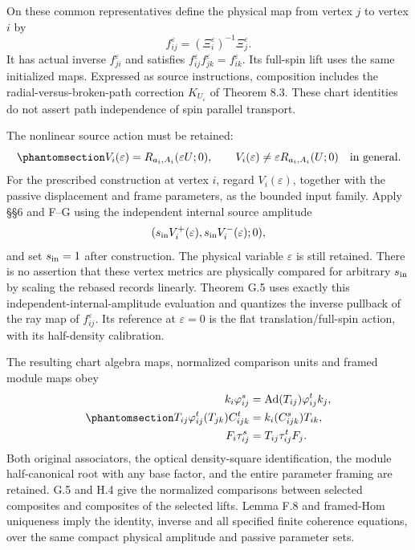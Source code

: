 \documentclass[
  english,
  11pt,
  reqno]{amsart}
\begin{document}
On these common representatives define the physical map from vertex
\(j\) to vertex \(i\) by \[
 f_{ij}^\varepsilon=(\Xi_i^\varepsilon)^{-1}\Xi_j^\varepsilon.
\] It has actual inverse \(f_{ji}^\varepsilon\) and satisfies
\(f_{ij}^\varepsilon f_{jk}^\varepsilon=f_{ik}^\varepsilon\). Its
full-spin lift uses the same initialized maps. Expressed as source
instructions, composition includes the radial-versus-broken-path
correction \(K_{U_\varepsilon}\) of Theorem 8.3. These chart identities
do not assert path independence of spin parallel transport.

The nonlinear source action must be retained:
\begin{equation}\protect\phantomsection\label{eq:schw-bc-amplitude-rebase-distinction}{
 V_i(\varepsilon)=R_{a_i,A_i}(\varepsilon U;0),\qquad
 V_i(\varepsilon)\ne\varepsilon R_{a_i,A_i}(U;0)
 \quad\hbox{in general}.
}\end{equation} For the prescribed construction at vertex \(i\), regard
\(V_i(\varepsilon)\), together with the passive displacement and frame
parameters, as the bounded input family. Apply §§6 and F--G using the
independent internal source amplitude \[
 (s_{\rm in}V_i^+(\varepsilon),s_{\rm in}V_i^-(\varepsilon);0),
\] and set \(s_{\rm in}=1\) after construction. The physical variable
\(\varepsilon\) is still retained. There is no assertion that these
vertex metrics are physically compared for arbitrary \(s_{\rm in}\) by
scaling the rebased records linearly. Theorem G.5 uses exactly this
independent-internal-amplitude evaluation and quantizes the inverse
pullback of the ray map of \(f_{ij}^\varepsilon\). Its reference at
\(\varepsilon=0\) is the flat translation/full-spin action, with its
half-density calibration.

The resulting chart algebra maps, normalized comparison units and framed
module maps obey
\begin{equation}\protect\phantomsection\label{eq:schw-bc-compatible-enriched-comparisons}{
 \begin{aligned}
 k_i\varphi^s_{ij}
    &=\operatorname{Ad}(T_{ij})\varphi^t_{ij}k_j,\\
 T_{ij}\varphi^t_{ij}(T_{jk})C^t_{ijk}
    &=k_i(C^s_{ijk})T_{ik},\\
 F_i\tau^s_{ij}&=T_{ij}\tau^t_{ij}F_j.
 \end{aligned}
}\end{equation} Both original associators, the optical density-square
identification, the module half-canonical root with any base factor, and
the entire parameter framing are retained. G.5 and H.4 give the
normalized comparisons between selected composites and composites of the
selected lifts. Lemma F.8 and framed-Hom uniqueness imply the identity,
inverse and all specified finite coherence equations, over the same
compact physical amplitude and passive parameter sets.
\end{document}
